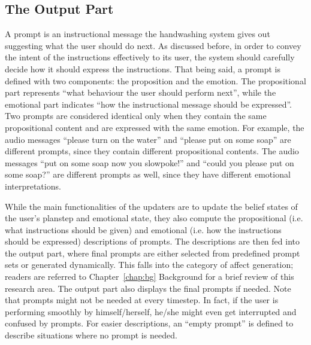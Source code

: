\subsection{The Output Part}

A prompt is an instructional message the handwashing system gives out suggesting what the user should do next. As discussed before, in order to convey the intent of the instructions effectively to its user, the system should carefully decide how it should express the instructions. That being said, a prompt is defined with two components: the proposition and the emotion. The propositional part represents ``what behaviour the user should perform next'', while the emotional part indicates ``how the instructional message should be expressed''. Two prompts are considered identical only when they contain the same propositional content and are expressed with the same emotion. For example, the audio messages ``please turn on the water'' and ``please put on some soap'' are different prompts, since they contain different propositional contents. The audio messages ``put on some soap now you slowpoke!'' and ``could you please put on some soap?'' are different prompts as well, since they have different emotional interpretations.

While the main functionalities of the updaters are to update the belief states of the user's planstep and emotional state, they also compute the propositional (i.e. what instructions should be given) and emotional (i.e. how the instructions should be expressed) descriptions of prompts. The descriptions are then fed into the output part, where final prompts are either selected from predefined prompt sets or generated dynamically. This falls into the category of affect generation; readers are referred to Chapter~\ref{chap:bg} Background for a brief review of this research area. The output part also displays the final prompts if needed. Note that prompts might not be needed at every timestep. In fact, if the user is performing smoothly by himself/herself, he/she might even get interrupted and confused by prompts. For easier descriptions, an ``empty prompt'' is defined to describe situations where no prompt is needed.

